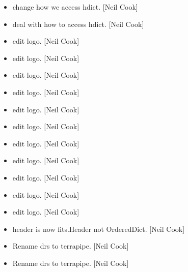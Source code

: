 \documentclass[a4paper,10pt,english]{report}
\begin{document}
\begin{itemize}
\item {} 
 \sphinxhyphen{} change how we access hdict. {[}Neil Cook{]}

\item {} 
 \sphinxhyphen{} deal with how to access hdict. {[}Neil Cook{]}

\item {} 
 \sphinxhyphen{} edit logo. {[}Neil Cook{]}

\item {} 
 \sphinxhyphen{} edit logo. {[}Neil Cook{]}

\item {} 
 \sphinxhyphen{} edit logo. {[}Neil Cook{]}

\item {} 
 \sphinxhyphen{} edit logo. {[}Neil Cook{]}

\item {} 
 \sphinxhyphen{} edit logo. {[}Neil Cook{]}

\item {} 
 \sphinxhyphen{} edit logo. {[}Neil Cook{]}

\item {} 
 \sphinxhyphen{} edit logo. {[}Neil Cook{]}

\item {} 
 \sphinxhyphen{} edit logo. {[}Neil Cook{]}

\item {} 
 \sphinxhyphen{} edit logo. {[}Neil Cook{]}

\item {} 
 \sphinxhyphen{} edit logo. {[}Neil Cook{]}

\item {} 
 \sphinxhyphen{} edit logo. {[}Neil Cook{]}

\item {} 
 \sphinxhyphen{} header is now fits.Header not OrderedDict. {[}Neil Cook{]}

\item {} 
Rename drs to terrapipe. {[}Neil Cook{]}

\item {} 
Rename drs to terrapipe. {[}Neil Cook{]}


\end{itemize}
\end{document}
